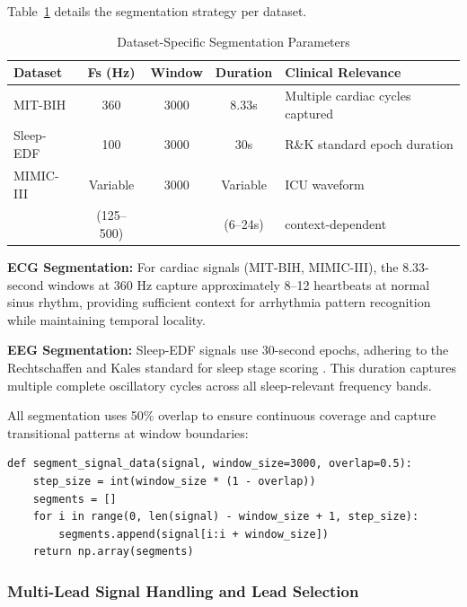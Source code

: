 \documentclass[conference]{IEEEtran}
\begin{document}
Table~\ref{tab:segmentation_params} details the segmentation strategy per dataset.

\begin{table}[htbp]
\centering
\caption{Dataset-Specific Segmentation Parameters}
\label{tab:segmentation_params}
\begin{tabular}{|l|c|c|c|p{3.5cm}|}
\hline
\textbf{Dataset} & \textbf{Fs (Hz)} & \textbf{Window} & \textbf{Duration} & \textbf{Clinical Relevance} \\ \hline
MIT-BIH & 360 & 3000 & 8.33s & Multiple cardiac cycles captured \\ \hline
Sleep-EDF & 100 & 3000 & 30s & R\&K standard epoch duration \\ \hline
MIMIC-III & Variable & 3000 & Variable & ICU waveform \\
 & (125--500) & & (6--24s) & context-dependent \\ \hline
\end{tabular}
\end{table}

\textbf{ECG Segmentation:} For cardiac signals (MIT-BIH, MIMIC-III), the 8.33-second windows at 360 Hz capture approximately 8--12 heartbeats at normal sinus rhythm, providing sufficient context for arrhythmia pattern recognition while maintaining temporal locality.

\textbf{EEG Segmentation:} Sleep-EDF signals use 30-second epochs, adhering to the Rechtschaffen and Kales standard for sleep stage scoring \cite{rechtschaffen1968}. This duration captures multiple complete oscillatory cycles across all sleep-relevant frequency bands.

All segmentation uses 50\% overlap to ensure continuous coverage and capture transitional patterns at window boundaries:

\begin{lstlisting}[caption={Signal segmentation implementation},label={lst:segment}]
def segment_signal_data(signal, window_size=3000, overlap=0.5):
    step_size = int(window_size * (1 - overlap))
    segments = []
    for i in range(0, len(signal) - window_size + 1, step_size):
        segments.append(signal[i:i + window_size])
    return np.array(segments)
\end{lstlisting}

\subsubsection{Multi-Lead Signal Handling and Lead Selection}
\end{document}
